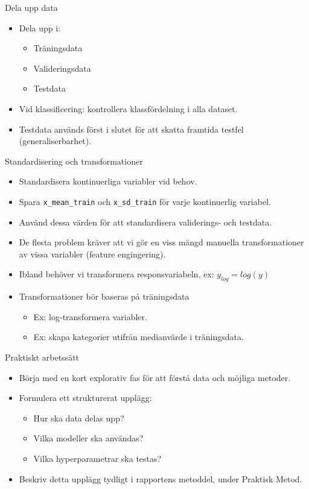 \documentclass[10pt,english]{beamer}
\begin{document}
\begin{frame}{Dela upp data}
\begin{itemize}
    \item Dela upp i:
    \begin{itemize}
        \item Träningsdata
        \item Valideringsdata
        \item Testdata
    \end{itemize}
    \item Vid klassificering: kontrollera klassfördelning i alla dataset.
    \item Testdata används först i slutet för att skatta framtida testfel (generaliserbarhet).
\end{itemize}
\end{frame}

\begin{frame}{Standardisering och transformationer}
\begin{itemize}
    \item Standardisera kontinuerliga variabler vid behov.
    \item Spara \texttt{x\_mean\_train} och \texttt{x\_sd\_train} för varje kontinuerlig variabel.
    \item Använd dessa värden för att standardisera validerings- och testdata.
    \item De flesta problem kräver att vi gör en viss mängd manuella 
    transformationer av vissa variabler (feature engingering).
    \item Ibland behöver vi transformera responsvariabeln, ex: $y_{log} = log(y)$
    \item Transformationer bör baseras på träningsdata
    \begin{itemize}
        \item Ex: log-transformera variabler.
        \item Ex: skapa kategorier utifrån medianvärde i träningsdata.
    \end{itemize}
\end{itemize}
\end{frame}

\begin{frame}{Praktiskt arbetssätt}
\begin{itemize}
    \item Börja med en kort explorativ fas för att förstå data och möjliga metoder.
    \item Formulera ett strukturerat upplägg:
    \begin{itemize}
        \item Hur ska data delas upp?
        \item Vilka modeller ska användas?
        \item Vilka hyperparametrar ska testas?
    \end{itemize}
    \item Beskriv detta upplägg tydligt i rapportens metoddel, under Praktisk Metod.
\end{itemize}
\end{frame}
\end{document}
